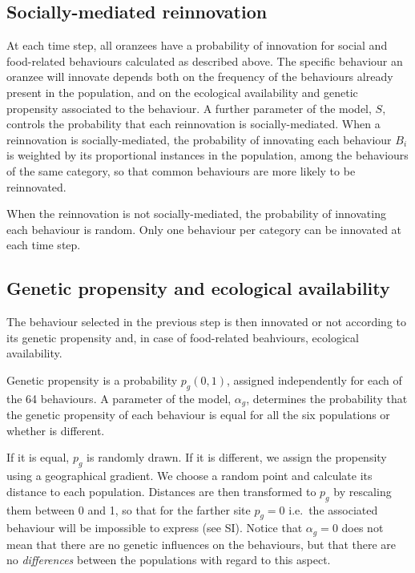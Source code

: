 \documentclass[9pt,twocolumn,twoside,]{pnas-new}
\begin{document}
\subsection*{Socially-mediated reinnovation}\label{format}

At each time step, all oranzees have a probability of innovation for
social and food-related behaviours calculated as described above. The
specific behaviour an oranzee will innovate depends both on the
frequency of the behaviours already present in the population, and on
the ecological availability and genetic propensity associated to the
behaviour. A further parameter of the model, \(S\), controls the
probability that each reinnovation is socially-mediated. When a
reinnovation is socially-mediated, the probability of innovating each
behaviour \(B_i\) is weighted by its proportional instances in the
population, among the behaviours of the same category, so that common
behaviours are more likely to be reinnovated.

When the reinnovation is not socially-mediated, the probability of
innovating each behaviour is random. Only one behaviour per category can
be innovated at each time step.

\subsection*{Genetic propensity and ecological
availability}\label{format}

The behaviour selected in the previous step is then innovated or not
according to its genetic propensity and, in case of food-related
beahviours, ecological availability.

Genetic propensity is a probability \(p_g(0,1)\), assigned independently
for each of the 64 behaviours. A parameter of the model, \(\alpha_g\),
determines the probability that the genetic propensity of each behaviour
is equal for all the six populations or whether is different.

If it is equal, \(p_g\) is randomly drawn. If it is different, we assign
the propensity using a geographical gradient. We choose a random point
and calculate its distance to each population. Distances are then
transformed to \(p_g\) by rescaling them between 0 and 1, so that for
the farther site \(p_g=0\) i.e.~the associated behaviour will be
impossible to express (see SI). Notice that \(\alpha_g=0\) does not mean
that there are no genetic influences on the behaviours, but that there
are no \emph{differences} between the populations with regard to this
aspect.
\end{document}
